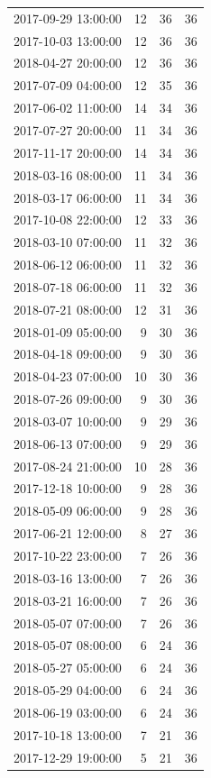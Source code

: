 \begin{tabular}{lrrr}
2017-09-29 13:00:00 & 12 & 36 & 36 \\
2017-10-03 13:00:00 & 12 & 36 & 36 \\
2018-04-27 20:00:00 & 12 & 36 & 36 \\
2017-07-09 04:00:00 & 12 & 35 & 36 \\
2017-06-02 11:00:00 & 14 & 34 & 36 \\
2017-07-27 20:00:00 & 11 & 34 & 36 \\
2017-11-17 20:00:00 & 14 & 34 & 36 \\
2018-03-16 08:00:00 & 11 & 34 & 36 \\
2018-03-17 06:00:00 & 11 & 34 & 36 \\
2017-10-08 22:00:00 & 12 & 33 & 36 \\
2018-03-10 07:00:00 & 11 & 32 & 36 \\
2018-06-12 06:00:00 & 11 & 32 & 36 \\
2018-07-18 06:00:00 & 11 & 32 & 36 \\
2018-07-21 08:00:00 & 12 & 31 & 36 \\
2018-01-09 05:00:00 & 9 & 30 & 36 \\
2018-04-18 09:00:00 & 9 & 30 & 36 \\
2018-04-23 07:00:00 & 10 & 30 & 36 \\
2018-07-26 09:00:00 & 9 & 30 & 36 \\
2018-03-07 10:00:00 & 9 & 29 & 36 \\
2018-06-13 07:00:00 & 9 & 29 & 36 \\
2017-08-24 21:00:00 & 10 & 28 & 36 \\
2017-12-18 10:00:00 & 9 & 28 & 36 \\
2018-05-09 06:00:00 & 9 & 28 & 36 \\
2017-06-21 12:00:00 & 8 & 27 & 36 \\
2017-10-22 23:00:00 & 7 & 26 & 36 \\
2018-03-16 13:00:00 & 7 & 26 & 36 \\
2018-03-21 16:00:00 & 7 & 26 & 36 \\
2018-05-07 07:00:00 & 7 & 26 & 36 \\
2018-05-07 08:00:00 & 6 & 24 & 36 \\
2018-05-27 05:00:00 & 6 & 24 & 36 \\
2018-05-29 04:00:00 & 6 & 24 & 36 \\
2018-06-19 03:00:00 & 6 & 24 & 36 \\
2017-10-18 13:00:00 & 7 & 21 & 36 \\
2017-12-29 19:00:00 & 5 & 21 & 36 \\

\end{tabular}
